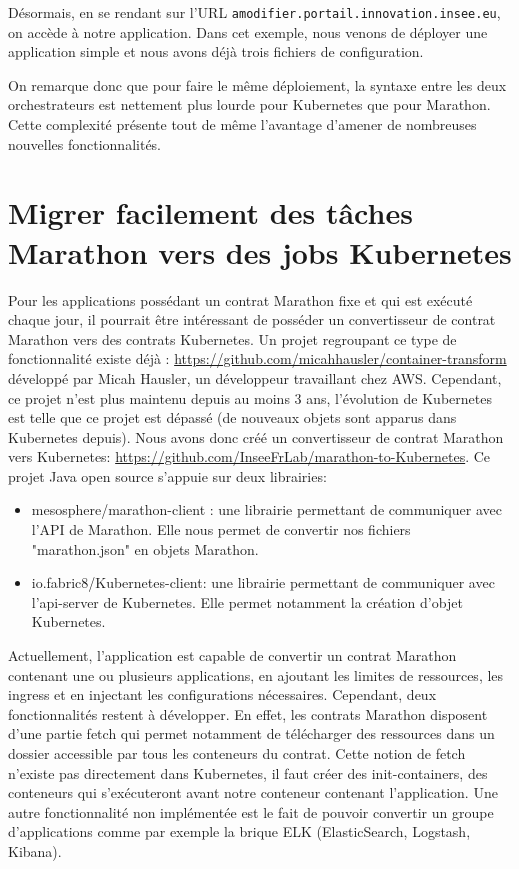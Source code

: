 \documentclass[11pt,fleqn]{book} %
\begin{document}
Désormais, en se rendant sur l'URL \texttt{amodifier.portail.innovation.insee.eu}, on accède à notre application. Dans cet exemple, nous venons de déployer une application simple et nous avons déjà trois fichiers de configuration.\newline

On remarque donc que pour faire le même déploiement, la syntaxe entre les deux orchestrateurs est nettement plus lourde pour Kubernetes que pour Marathon. Cette complexité présente tout de même l'avantage d'amener de nombreuses nouvelles fonctionnalités.


\section*{Migrer facilement des tâches Marathon vers des jobs Kubernetes}
Pour les applications possédant un contrat Marathon fixe et qui est exécuté chaque jour, il pourrait être intéressant de posséder un convertisseur de contrat Marathon vers des contrats Kubernetes. Un projet regroupant ce type de fonctionnalité existe déjà : \url{https://github.com/micahhausler/container-transform} développé par Micah Hausler, un développeur travaillant chez AWS. Cependant, ce projet n'est plus maintenu depuis au moins 3 ans, l'évolution de Kubernetes est telle que ce projet est dépassé (de nouveaux objets sont apparus dans Kubernetes depuis). Nous avons donc créé un convertisseur de contrat Marathon vers Kubernetes: \url{https://github.com/InseeFrLab/marathon-to-Kubernetes}. Ce projet Java open source s'appuie sur deux librairies: \begin{itemize}
    \item mesosphere/marathon-client : une librairie permettant de communiquer avec l'API de Marathon. Elle nous permet de convertir nos fichiers "marathon.json" en objets Marathon.
    \item io.fabric8/Kubernetes-client: une librairie permettant de communiquer avec l'api-server de Kubernetes. Elle permet notamment la création d'objet Kubernetes.\newline 
\end{itemize}

Actuellement, l'application est capable de convertir un contrat Marathon contenant une ou plusieurs applications, en ajoutant les limites de ressources, les ingress et en injectant les configurations nécessaires. Cependant, deux fonctionnalités restent à développer. En effet, les contrats Marathon disposent d'une partie fetch qui permet notamment de télécharger des ressources dans un dossier accessible par tous les conteneurs du contrat. Cette notion de fetch n'existe pas directement dans Kubernetes, il faut créer des init-containers, des conteneurs qui s'exécuteront avant notre conteneur contenant l'application. Une autre fonctionnalité non implémentée est le fait de pouvoir convertir un groupe d'applications comme par exemple la brique ELK (ElasticSearch, Logstash, Kibana).\newline
\end{document}

